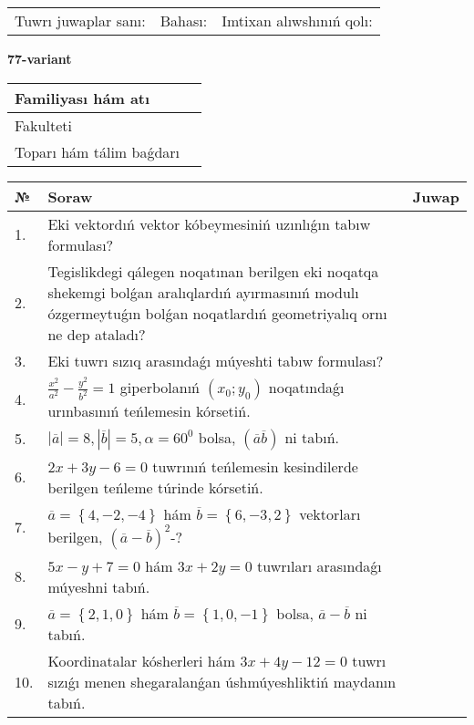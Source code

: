 \documentclass{article}
\begin{document}
\vspace{1cm}

\begin{tabular}{lll}
Tuwrı juwaplar sanı: \underline{\hspace{1.5cm}} & 
Bahası: \underline{\hspace{1.5cm}} & 
Imtixan alıwshınıń qolı: \underline{\hspace{2cm}} \\
\end{tabular}

\egroup

\newpage


\textbf{77-variant}\\

\bgroup
\def\arraystretch{1.6} %

\begin{tabular}{|m{5.7cm}|m{9.5cm}|}
\hline
Familiyası hám atı & \\
\hline
Fakulteti  & \\
\hline
Toparı hám tálim baǵdarı  & \\
\hline
\end{tabular}

\vspace{1cm}

\begin{tabular}{|m{0.7cm}|m{10cm}|m{4cm}|}
\hline
№ & Soraw & Juwap \\
\hline
1. & Eki vektordıń vektor kóbeymesiniń uzınlıǵın tabıw formulası? &  \\
\hline
2. & Tegislikdegi qálegen noqatınan berilgen eki noqatqa shekemgi bolǵan aralıqlardıń ayırmasınıń modulı ózgermeytuǵın bolǵan noqatlardıń geometriyalıq ornı ne dep ataladı? &  \\
\hline
3. & Eki tuwrı sızıq arasındaǵı múyeshti tabıw formulası? &  \\
\hline
4. & $\frac{x^2}{a^2}-\frac{y^2}{b^2}=1$ giperbolanıń $(x_0;y_0)$ noqatındaǵı urınbasınıń teńlemesin kórsetiń. &  \\
\hline
5. & $\left| \overline{a} \right|=8, \left| \overline{b} \right|=5, \alpha=60^{0}$ bolsa, $( \overline{a}\overline{b} )$ ni tabıń. &  \\
\hline
6. & $2x+3y-6=0$ tuwrınıń teńlemesin kesindilerde berilgen teńleme túrinde kórsetiń. &  \\
\hline
7. & $\overline{a}=\left\{ 4,-2,-4 \right\}$ hám $\overline{b}=\left\{ 6,-3, 2 \right\}$ vektorları berilgen, $(\overline{a}-\overline{b}) ^{2}$-? &  \\
\hline
8. & $5x-y+7=0$ hám $3x+2y=0$ tuwrıları arasındaǵı múyeshni tabıń. &  \\
\hline
9. & $\overline{a}=\left\{ 2, 1, 0 \right\}$ hám $\overline{b}=\left\{ 1, 0,-1 \right\}$ bolsa, $\overline{a}-\overline{b}$ ni tabıń. &  \\
\hline
10. & Koordinatalar kósherleri hám $ 3x+4y-12=0 $ tuwrı sızıǵı menen shegaralanǵan úshmúyeshliktiń maydanın tabıń. &  \\
\hline
\end{tabular}
\end{document}
